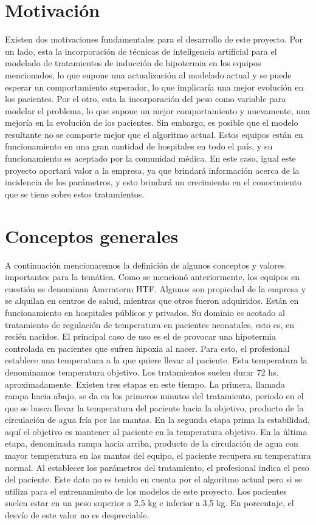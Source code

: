 \vspace{1cm}

\section{Motivación}

Existen dos motivaciones fundamentales para el desarrollo de este proyecto. Por un lado, esta la incorporación de técnicas de inteligencia artificial para el modelado de tratamientos de inducción de hipotermia en los equipos mencionados, lo que supone una actualización al modelado actual y se puede esperar un comportamiento superador, lo que implicaría una mejor evolución en los pacientes. Por el otro, esta la incorporación del peso como variable para modelar el problema, lo que supone un mejor comportamiento y nuevamente, una mejoría en la evolución de los pacientes.
Sin embargo, es posible que el modelo resultante no se comporte mejor que el algoritmo actual. Estos equipos están en funcionamiento en una gran cantidad de hospitales en todo el país, y su funcionamiento es aceptado por la comunidad médica. En este caso, igual este proyecto aportará valor a la empresa, ya que brindará información acerca de la incidencia de los parámetros, y esto brindará un crecimiento en el conocimiento que se tiene sobre estos tratamientos.


\section{Conceptos generales}
A continuación mencionaremos la definición de algunos conceptos y valores importantes para la temática.
Como se mencionó anteriormente, los equipos en cuestión se denominan Amrraterm HTF. Algunos son propiedad de la empresa y se alquilan en centros de salud, mientras que otros fueron adquiridos. Están en funcionamiento en hospitales públicos y privados. Su dominio es acotado al tratamiento de regulación de temperatura en pacientes neonatales, esto es, en recién nacidos. El principal caso de uso es el de provocar una hipotermia controlada en pacientes que sufren hipoxia al nacer. Para esto, el profesional establece una temperatura a la que quiere llevar al paciente. Esta temperatura la denominamos temperatura objetivo. 
Los tratamientos suelen durar 72 hs. aproximadamente. Existen tres etapas en este tiempo. La primera, llamada rampa hacia abajo, se da en los primeros minutos del tratamiento, periodo en el que se busca llevar la temperatura del paciente hacia la objetivo, producto de la circulación de agua fría por las mantas. En la segunda etapa prima la estabilidad, aquí el objetivo es mantener al paciente en la temperatura objetivo. En la última etapa, denominada rampa hacia arriba, producto de la circulación de agua con mayor temperatura en las mantas del equipo, el paciente recupera su temperatura normal.
Al establecer los parámetros del tratamiento, el profesional indica el peso del paciente. Este dato no es tenido en cuenta por el algoritmo actual pero si se utiliza para el entrenamiento de los modelos de este proyecto.
Los pacientes suelen estar en un peso superior a 2,5 kg e inferior a 3,5 kg. En porcentaje, el desvío de este valor no es despreciable.

